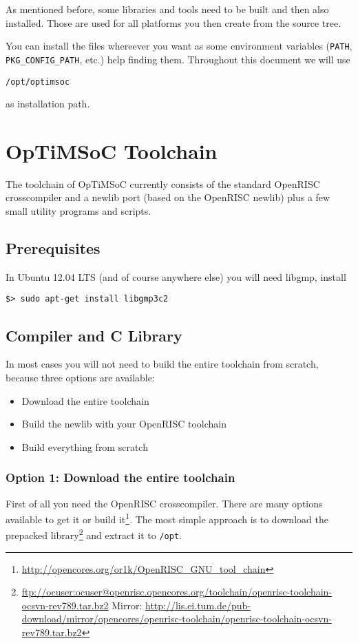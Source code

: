 As mentioned before, some libraries and tools need to be built and
then also installed. Those are used for all platforms you then create
from the source tree.

You can install the files whereever you want as some environment
variables (\verb|PATH|, \verb|PKG_CONFIG_PATH|, etc.) help finding
them. Throughout this document we will use

\begin{alltt}
/opt/optimsoc
\end{alltt}

as installation path.

\section{OpTiMSoC Toolchain}

The toolchain of OpTiMSoC currently consists of the standard OpenRISC
crosscompiler and a newlib port (based on the OpenRISC newlib) plus a
few small utility programs and scripts.

\subsection{Prerequisites}

In Ubuntu 12.04 LTS (and of course anywhere else) you will need
libgmp, install

\begin{verbatim}
$> sudo apt-get install libgmp3c2
\end{verbatim}

\subsection{Compiler and C Library}

In most cases you will not need to build the entire toolchain from
scratch, because three options are available:

\begin{itemize}
\item Download the entire toolchain
\item Build the newlib with your OpenRISC toolchain
\item Build everything from scratch
\end{itemize}

\subsubsection{Option 1: Download the entire toolchain}
First of all you need the OpenRISC crosscompiler. There are many
options available to get it or build
it\footnote{\url{http://opencores.org/or1k/OpenRISC_GNU_tool_chain}}.
The most simple approach is to download the prepacked
library\footnote{\url{ftp://ocuser:ocuser@openrisc.opencores.org/toolchain/openrisc-toolchain-ocsvn-rev789.tar.bz2}
  Mirror:
  \url{http://lis.ei.tum.de/pub-download/mirror/opencores/openrisc-toolchain/openrisc-toolchain-ocsvn-rev789.tar.bz2}}
and extract it to \verb|/opt|.

